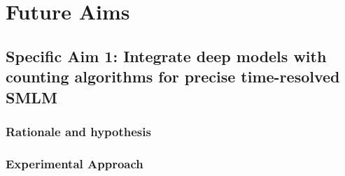 \documentclass{ucetd}
\begin{document}

\section{Future Aims}

\subsection{Specific Aim 1: Integrate deep models with counting algorithms for precise time-resolved SMLM}

\subsubsection{Rationale and hypothesis}



\subsubsection{Experimental Approach}
\end{document}
